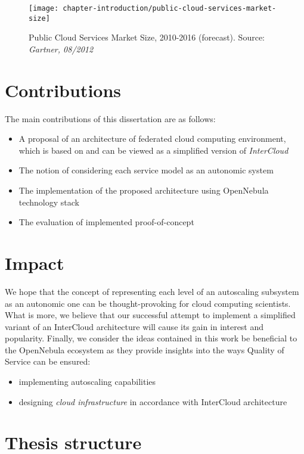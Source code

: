 \begin{figure}[!ht]
  \begin{center}
    \texttt{[image: chapter-introduction/public-cloud-services-market-size]}
  \end{center}
  \caption{Public Cloud Services Market Size, 2010-2016 (forecast). Source: \textit{Gartner, 08/2012}}
  \label{chapter-fig:public-cloud-services-market-size}
\end{figure}

\section{Contributions}
The main contributions of this dissertation are as follows:
\begin{itemize}
  \item A proposal of an architecture of federated cloud computing environment, which is based on and can be viewed as a simplified version of \emph{InterCloud}
  \item The notion of considering each service model as an autonomic system
  \item The implementation of the proposed architecture using OpenNebula technology stack
  \item The evaluation of implemented proof-of-concept
\end{itemize}

\section{Impact}
We hope that the concept of representing each level of an autoscaling subsystem as an autonomic one can be thought-provoking for cloud computing scientists.  What is more, we believe that our successful attempt to implement a simplified variant of an InterCloud architecture will cause its gain in interest and popularity. 
Finally, we consider the ideas contained in this work be beneficial to the OpenNebula ecosystem as they provide insights into the ways Quality of Service can be ensured:
\begin{itemize}
  \item implementing autoscaling capabilities
  \item designing \emph{cloud infrastructure} in accordance with InterCloud architecture
\end{itemize}

\section{Thesis structure}

